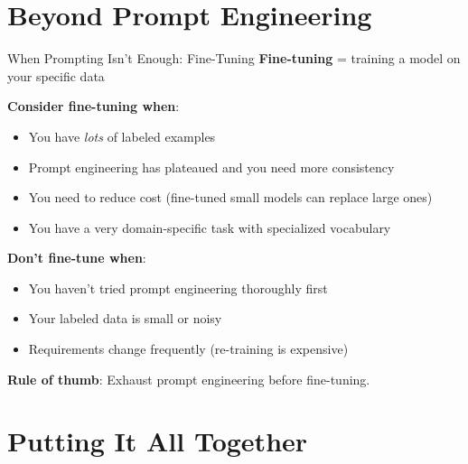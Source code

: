 \documentclass[aspectratio=169]{beamer}
\begin{document}
\section{Beyond Prompt Engineering}

\begin{frame}{When Prompting Isn't Enough: Fine-Tuning}
\textbf{Fine-tuning} = training a model on your specific data
\vspace{0.3cm}

\textbf{Consider fine-tuning when}:
\begin{itemize}
    \item You have \emph{lots} of labeled examples
    \item Prompt engineering has plateaued and you need more consistency
    \item You need to reduce cost (fine-tuned small models can replace large ones)
    \item You have a very domain-specific task with specialized vocabulary
\end{itemize}
\vspace{0.3cm}

\textbf{Don't fine-tune when}:
\begin{itemize}
    \item You haven't tried prompt engineering thoroughly first
    \item Your labeled data is small or noisy
    \item Requirements change frequently (re-training is expensive)
\end{itemize}
\vspace{0.3cm}

\textbf{Rule of thumb}: Exhaust prompt engineering before fine-tuning.
\end{frame}

\section{Putting It All Together}
\end{document}
